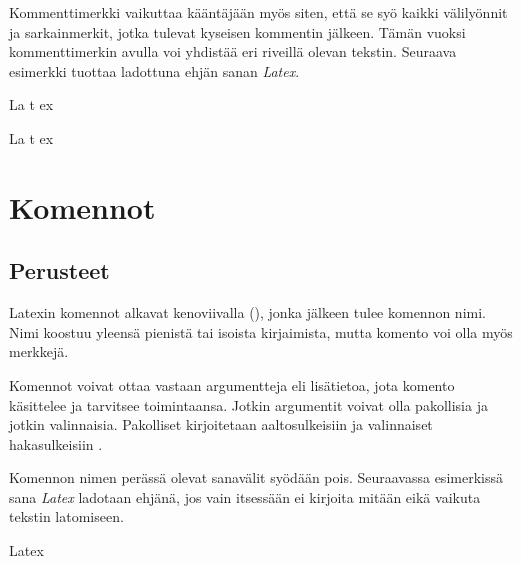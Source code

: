 \begin{koodilohkosis}
\end{koodilohkosis}

Kommenttimerkki vaikuttaa kääntäjään myös siten, että se syö kaikki
välilyönnit ja sarkainmerkit, jotka tulevat kyseisen kommentin jälkeen.
Tämän vuoksi kommenttimerkin avulla voi yhdistää eri riveillä olevan
tekstin. Seuraava esimerkki tuottaa ladottuna ehjän sanan \emph{Latex}.

\begin{koodilohkosis}
  La%
    t%
      ex
\end{koodilohkosis}

\begin{tulossis}
  La%
    t%
      ex
\end{tulossis}

\section{Komennot}

\subsection{Perusteet}

Latexin komennot alkavat kenoviivalla (\koodi{\textbackslash}), jonka
jälkeen tulee komennon nimi. Nimi koostuu yleensä pienistä tai isoista
kirjaimista, mutta komento voi olla myös merkkejä.

Komennot voivat ottaa vastaan argumentteja eli lisätietoa, jota komento
käsittelee ja tarvitsee toimintaansa. Jotkin argumentit voivat olla
pakollisia ja jotkin valinnaisia. Pakolliset kirjoitetaan
aaltosulkeisiin \koodi{\{\ldots\}} ja valinnaiset hakasulkeisiin
\koodi{[\ldots]}.

\begin{koodilohkosis}
  \komento
\end{koodilohkosis}

Komennon nimen perässä olevat sanavälit syödään pois. Seuraavassa
esimerkissä sana \emph{Latex} ladotaan ehjänä, jos vain  itsessään ei kirjoita mitään eikä vaikuta tekstin latomiseen.

\begin{koodilohkosis}
  La\komento   tex
\end{koodilohkosis}

